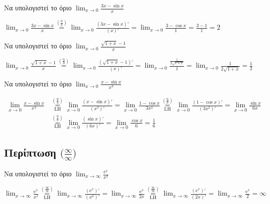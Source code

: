 \begin{example}
  Να υπολογιστεί το όριο $ \lim_{x \to 0} \frac{3x- \sin{x}}{x} $
\end{example}
\begin{solution}
  $ \lim_{x \to 0} \frac{3x- \sin{x}}{x} \overset{(\frac{0}{0})}{=} \lim_{x \to 0}
  \frac{(3x- \sin{x} )'}{(x)'} = \lim_{x \to 0} \frac{3- \cos{x}}{1} = \frac{3- 1}{1}
  = 2 $
\end{solution}

\begin{example}
  Να υπολογιστεί το όριο $ \lim_{x \to 0} \frac{\sqrt{1+x} -1}{x} $
\end{example}
\begin{solution}
  $ \lim_{x \to 0} \frac{\sqrt{1+x} -1}{x} \overset{(\frac{0}{0})}{=} \lim_{x \to 0}
  \frac{(\sqrt{1+x} -1)'}{(x)'} = \lim_{x \to 0} \frac{\frac{1}{2 \sqrt{1+x}}}{1} = 
  \lim_{x \to 0} \frac{1}{2 \sqrt{1+x}} = \frac{1}{2} $
\end{solution}

\begin{example}
  Να υπολογιστεί το όριο $ \lim_{x \to 0} \frac{x- \sin{x}}{x^{3}} $
\end{example}
\begin{solution}
  \begin{align*}
    \lim_{x \to 0} \frac{x - \sin{x}}{x^{3}}
   &\overset{\left(\frac{0}{0}\right)}{\underset{\mathrm{LH}}{=}} \lim_{x \to 0}
   \frac{(x- \sin{x})'}{(x^{3})'} = \lim_{x \to 0} \frac{1 - \cos{x}}{3x^{2}}
   \overset{\left(\frac{0}{0}\right)}{\underset{\mathrm{LH}}{=}} \lim_{x \to 0}
   \frac{(1- \cos{x} )'}{(3x^{2})'} = \lim_{x \to 0} \frac{\sin{x}}{6x} \\
   &\overset{\left(\frac{0}{0}\right)}{\underset{\mathrm{LH}}{=}} \lim_{x \to 0}
   \frac{(\sin{x} )'}{(6x)'} = \lim_{x \to 0} \frac{\cos{x}}{6} = \frac{1}{6} 
  \end{align*}
\end{solution}


\subsection*{Περίπτωση $ \bigl(\frac{\infty}{\infty}\bigr) $}

\begin{example}
  Να υπολογιστεί το όριο $ \lim_{x \to \infty} \frac{\mathrm{e}^{x}}{x^{2}} $
\end{example}
\begin{solution}
  $ \lim_{x \to \infty} \frac{\mathrm{e}^{x}}{x^{2}}
  \overset{\left(\frac{\infty}{\infty}\right)}{\underset{\mathrm{LH}}{=}} \lim_{x \to
  \infty} \frac{(\mathrm{e}^{x} )'}{(x^{2})'} = \lim_{x \to \infty}
  \frac{\mathrm{e}^{x}}{2x}
  \overset{\left(\frac{\infty}{\infty}\right)}{\underset{\mathrm{LH}}{=}} 
  \lim_{x \to \infty} \frac{(\mathrm{e}^{x})'}{(2x)'} = \lim_{x \to \infty}
  \frac{\mathrm{e}^{x}}{2} = \infty
  $ 
\end{solution}

